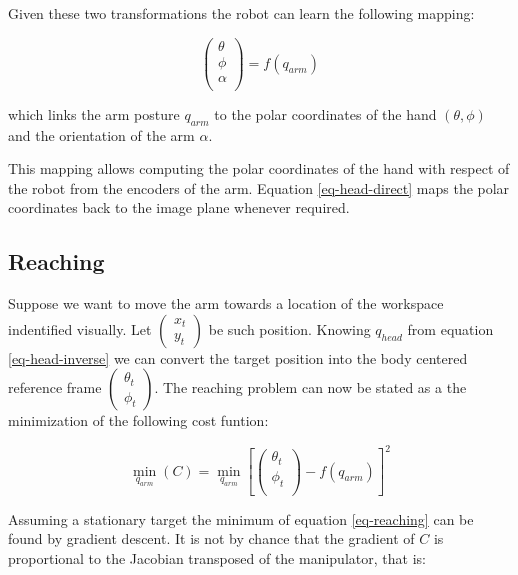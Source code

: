 Given these two transformations the robot can learn the following mapping:

\begin{equation}
  \left(\begin{array}{c}
    \theta \\
    \phi \\
    \alpha \\ 
    \end{array}\right)
  = f \left(q_{arm}\right)
\label{eq-arm-direct}
\end{equation}

which links the arm posture $q_{arm}$ to the polar coordinates of the 
hand $\left(\theta, \phi\right)$ and the orientation of the arm $\alpha$. 

This mapping allows computing the polar coordinates of the hand with 
respect of the robot from the encoders of the arm. Equation 
\ref{eq-head-direct} maps the polar coordinates back to the image plane 
whenever required.

\subsection{Reaching}
\label{sec-reaching}
Suppose we want to move the arm towards a location of the workspace 
indentified visually. Let $\left(\begin{array}{c} x_t \\ y_t\end{array}\right)$
be such position. Knowing $q_{head}$ from equation \ref{eq-head-inverse} 
we can convert the target position into the body centered reference frame 
$\left(\begin{array}{c} \theta_t  \\ \phi_t\end{array}\right)$. The 
reaching problem can now be stated as a the minimization of the following 
cost funtion:

\begin{equation}
  \displaystyle\min_{q_{arm}}\left(C\right)=\displaystyle\min_{q_{arm}}\left[
  \left(
  \begin{array}{c}
    \theta_t \\
    \phi_t \\
    \end{array}\right)
  -f \left(q_{arm}\right)
  \right]^2
\label{eq-reaching1}
\end{equation}

Assuming a stationary target the minimum of equation \ref{eq-reaching} 
can be found by gradient descent. It is not by chance that the 
gradient of $C$ is proportional to the Jacobian transposed 
of the manipulator, that is:

